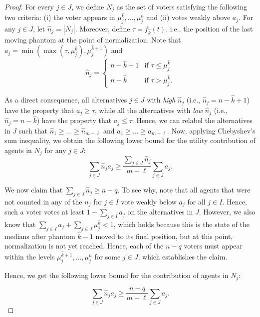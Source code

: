 \documentclass[11pt]{article}
\begin{document}
\begin{proof}
    For every $j \in J$, we define $N_j$ as the set of voters satisfying the following two criteria: (i) the voter appears in $\mu^{\hat{k}}_j, \dots, \mu^n_j$ and (ii) votes weakly above $a_j$. For any $j \in J$, let $\hat{n}_j = |N_j|$. Moreover, define $\tau = f_{\hat{k}}(t)$, i.e., the position of the last moving phantom at the point of normalization. Note that $a_j = \min(\max(\tau, \mu_j^{\hat{k}}),\mu_j^{\hat{k}+1})$ and  $$\hat{n}_j = \begin{cases} n-\hat{k} + 1 & \text{if } \tau \leq \mu_{j}^{\hat{k}} \\ n - \hat{k} & \text{if } \tau > \mu_{j}^{\hat{k}}.\end{cases}$$

    As a direct consequence, all alternatives $j\in J$ with \emph{high} $\hat{n}_j$ (i.e., $\hat{n}_j = n-\hat{k}+1$) have the property that $a_j \geq \tau$, while all the alternatives with \emph{low} $\hat{n}_j$ (i.e., $\hat{n}_j = n-\hat{k}$) have the property that $a_j \leq \tau$. Hence, we can relabel the alternatives in $J$ such that $\hat{n}_1 \geq \dots \geq \hat{n}_{m-\ell}$ and  $a_1 \geq \dots \geq a_{m-\ell}$. Now, applying Chebyshev's sum inequality, we obtain the following lower bound for the utility contribution of agents in $N_j$ for any $j \in J$: 
    \begin{equation}
        \sum_{j \in J} \hat{n}_j a_j \geq \frac{\sum_{j \in J} \hat{n}_j}{m- \ell} \sum_{j \in J} a_j. 
    \end{equation}

    We now claim that $\sum_{j \in J} \hat{n}_j \geq n-q$. To see why, note that all agents that were not counted in any of the $n_j$ for $j\in I$ vote weakly below $a_j$ for all $j \in I$. Hence, such a voter votes at least $1-\sum_{j \in I}a_j$ on the alternatives in $J$. However, we also know that $\sum_{j \in I} a_j + \sum_{j \in J} \mu_j^{\hat{k}} < 1$, which holds because this is the state of the medians after phantom $\hat{k} -1$ moved to its final position, but at this point, normalization is not yet reached. Hence, each of the $n-q$ voters must appear within the levels $\mu^{\hat{k}+1}_j, \dots, \mu^{n}_j$ for some $j \in J$, which establishes the claim.

    Hence, we get the following lower bound for the contribution of agents in $N_j$: 
    
    \begin{equation}\label{eq:mboundfour}
        \sum_{j \in J} \hat{n}_j a_j  \geq \frac{n-q}{m-\ell} \sum_{j \in J} a_j. 
    \end{equation}


\end{proof}
\end{document}
